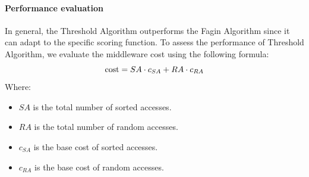 \paragraph*{Performance evaluation}
In general, the Threshold Algorithm outperforms the Fagin Algorithm since it can adapt to the specific scoring function. 
To assess the performance of Threshold Algorithm, we evaluate the middleware cost using the following formula:
\[\textnormal{cost} = SA \cdot c_{SA} + RA \cdot c_{RA}\]
Where:
\begin{itemize}
    \item $SA$ is the total number of sorted accesses.
    \item $RA$ is the total number of random accesses.
    \item $c_{SA}$ is the base cost of sorted accesses.
    \item $c_{RA}$ is the base cost of random accesses.
\end{itemize}

